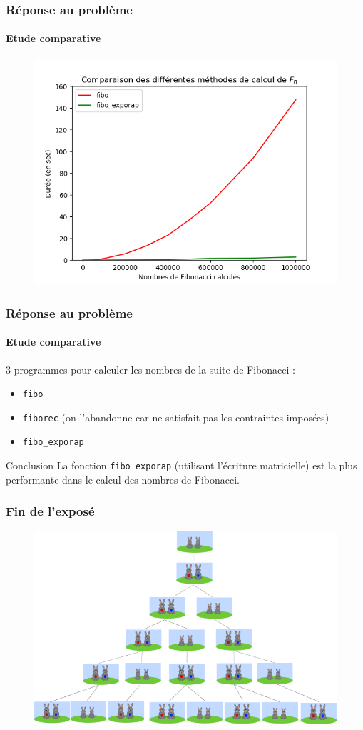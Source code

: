 \documentclass[10pt]{beamer}
\begin{document}
\begin{frame}
\frametitle{Réponse au problème}
\framesubtitle{Etude comparative}
\begin{figure}[t]
   \includegraphics[scale=0.5]{img/Figure.png}
\end{figure}
\end{frame}

\begin{frame}[fragile]
\frametitle{Réponse au problème}
\framesubtitle{Etude comparative}
3 programmes pour calculer les nombres de la suite de Fibonacci :
\begin{itemize}
\item \verb+fibo+
\item \verb+fiborec+ (on l'abandonne car ne satisfait pas les contraintes imposées)
\item \verb+fibo_exporap+ 
\end{itemize}

\begin{alertblock}{Conclusion}
La fonction \verb+fibo_exporap+ (utilisant l'écriture matricielle) est la plus performante dans le calcul des nombres de Fibonacci.
\end{alertblock}
\end{frame}




\begin{frame}
\frametitle{Fin de l'exposé}
\begin{figure}[t]
   \includegraphics[scale=0.4]{img/Lapins.png}
\end{figure}
\end{frame}
\end{document}
